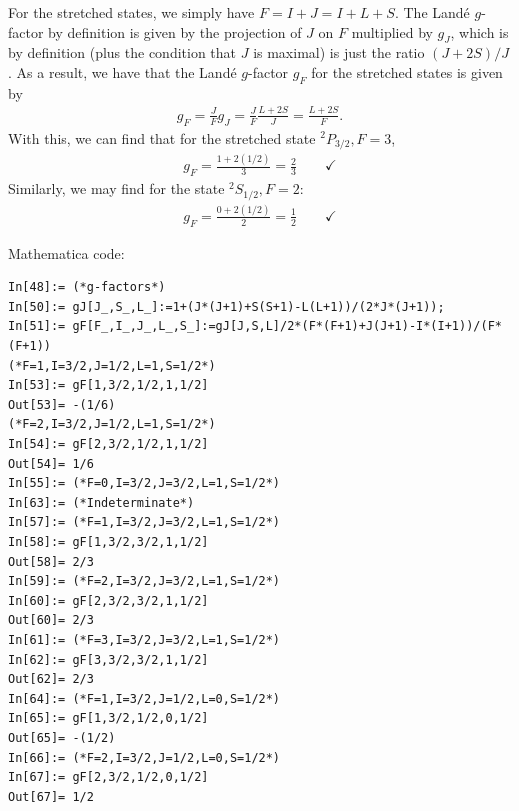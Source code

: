 \documentclass{article}
\theoremstyle{definition}
\newcommand{\f}[2]{\frac{#1}{#2}}
\begin{document}
For the stretched states, we simply have $F= I+J = I+ L +S$. The Land\'{e} $g$-factor by definition is given by the projection of $J$ on $F$ multiplied by $g_J$, which is by definition (plus the condition that $J$ is maximal) is just the ratio $(J+2S)/J$. As a result, we have that the Land\'{e} $g$-factor $g_F$ for the stretched states is given by 
\begin{align*}
g_F = \f{J}{F}g_J = \f{J}{F} \f{L+2S}{J} = \f{L+2S}{F}.
\end{align*}
With this, we can find that for the stretched state $^2P_{3/2}, F=3$, 
\begin{align*}
g_F= \f{1+2(1/2)}{3} = \f{2}{3} \quad\quad \checkmark
\end{align*}
Similarly, we may find for the state $^2S_{1/2}, F=2$:
\begin{align*}
g_F = \f{0+2(1/2)}{2} =\f{1}{2} \quad\quad\checkmark
\end{align*}




















\noindent Mathematica code:
\begin{lstlisting}
In[48]:= (*g-factors*)
In[50]:= gJ[J_,S_,L_]:=1+(J*(J+1)+S(S+1)-L(L+1))/(2*J*(J+1));
In[51]:= gF[F_,I_,J_,L_,S_]:=gJ[J,S,L]/2*(F*(F+1)+J(J+1)-I*(I+1))/(F*(F+1))
(*F=1,I=3/2,J=1/2,L=1,S=1/2*)
In[53]:= gF[1,3/2,1/2,1,1/2]
Out[53]= -(1/6)
(*F=2,I=3/2,J=1/2,L=1,S=1/2*)
In[54]:= gF[2,3/2,1/2,1,1/2]
Out[54]= 1/6
In[55]:= (*F=0,I=3/2,J=3/2,L=1,S=1/2*)
In[63]:= (*Indeterminate*)
In[57]:= (*F=1,I=3/2,J=3/2,L=1,S=1/2*)
In[58]:= gF[1,3/2,3/2,1,1/2]
Out[58]= 2/3
In[59]:= (*F=2,I=3/2,J=3/2,L=1,S=1/2*)
In[60]:= gF[2,3/2,3/2,1,1/2]
Out[60]= 2/3
In[61]:= (*F=3,I=3/2,J=3/2,L=1,S=1/2*)
In[62]:= gF[3,3/2,3/2,1,1/2]
Out[62]= 2/3
In[64]:= (*F=1,I=3/2,J=1/2,L=0,S=1/2*)
In[65]:= gF[1,3/2,1/2,0,1/2]
Out[65]= -(1/2)
In[66]:= (*F=2,I=3/2,J=1/2,L=0,S=1/2*)
In[67]:= gF[2,3/2,1/2,0,1/2]
Out[67]= 1/2
\end{lstlisting}
\end{document}
